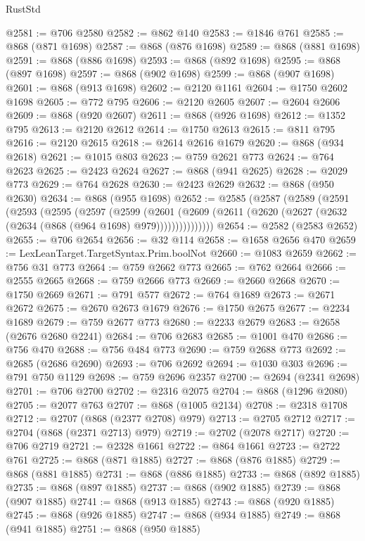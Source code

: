 \begin{lexlean}{RustStd}
\begin{coremodule}
@2581 := @706 @2580
@2582 := @862 @140
@2583 := @1846 @761
@2585 := @868 (@871 @1698)
@2587 := @868 (@876 @1698)
@2589 := @868 (@881 @1698)
@2591 := @868 (@886 @1698)
@2593 := @868 (@892 @1698)
@2595 := @868 (@897 @1698)
@2597 := @868 (@902 @1698)
@2599 := @868 (@907 @1698)
@2601 := @868 (@913 @1698)
@2602 := @2120 @1161
@2604 := @1750 @2602 @1698
@2605 := @772 @795
@2606 := @2120 @2605
@2607 := @2604 @2606
@2609 := @868 (@920 @2607)
@2611 := @868 (@926 @1698)
@2612 := @1352 @795
@2613 := @2120 @2612
@2614 := @1750 @2613
@2615 := @811 @795
@2616 := @2120 @2615
@2618 := @2614 @2616 @1679
@2620 := @868 (@934 @2618)
@2621 := @1015 @803
@2623 := @759 @2621 @773
@2624 := @764 @2623
@2625 := @2423 @2624
@2627 := @868 (@941 @2625)
@2628 := @2029 @773
@2629 := @764 @2628
@2630 := @2423 @2629
@2632 := @868 (@950 @2630)
@2634 := @868 (@955 @1698)
@2652 := @2585
    (@2587
      (@2589
        (@2591
          (@2593
            (@2595
              (@2597
                (@2599
                  (@2601
                    (@2609 (@2611 (@2620 (@2627 (@2632 (@2634 (@868 (@964 @1698) @979)))))))))))))))
@2654 := @2582 (@2583 @2652)
@2655 := @706 @2654
@2656 := @32 @114
@2658 := @1658 @2656 @470
@2659 := LexLeanTarget.TargetSyntax.Prim.boolNot
@2660 := @1083 @2659
@2662 := @756 @31 @773
@2664 := @759 @2662 @773
@2665 := @762 @2664
@2666 := @2555 @2665
@2668 := @759 @2666 @773
@2669 := @2660 @2668
@2670 := @1750 @2669
@2671 := @791 @577
@2672 := @764 @1689
@2673 := @2671 @2672
@2675 := @2670 @2673 @1679
@2676 := @1750 @2675
@2677 := @2234 @1689
@2679 := @759 @2677 @773
@2680 := @2233 @2679
@2683 := @2658 (@2676 @2680 @2241)
@2684 := @706 @2683
@2685 := @1001 @470
@2686 := @756 @470
@2688 := @756 @484 @773
@2690 := @759 @2688 @773
@2692 := @2685 (@2686 @2690)
@2693 := @706 @2692
@2694 := @1030 @303
@2696 := @791 @750 @1129
@2698 := @759 @2696 @2357
@2700 := @2694 (@2341 @2698)
@2701 := @706 @2700
@2702 := @2316 @2075
@2704 := @868 (@1296 @2080)
@2705 := @2077 @763
@2707 := @868 (@1005 @2134)
@2708 := @2318 @1708
@2712 := @2707 (@868 (@2377 @2708) @979)
@2713 := @2705 @2712
@2717 := @2704 (@868 (@2371 @2713) @979)
@2719 := @2702 (@2078 @2717)
@2720 := @706 @2719
@2721 := @2328 @1661
@2722 := @864 @1661
@2723 := @2722 @761
@2725 := @868 (@871 @1885)
@2727 := @868 (@876 @1885)
@2729 := @868 (@881 @1885)
@2731 := @868 (@886 @1885)
@2733 := @868 (@892 @1885)
@2735 := @868 (@897 @1885)
@2737 := @868 (@902 @1885)
@2739 := @868 (@907 @1885)
@2741 := @868 (@913 @1885)
@2743 := @868 (@920 @1885)
@2745 := @868 (@926 @1885)
@2747 := @868 (@934 @1885)
@2749 := @868 (@941 @1885)
@2751 := @868 (@950 @1885)

\end{coremodule}
\end{lexlean}

